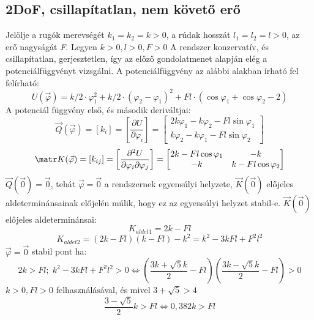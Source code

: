 \documentclass[12pt,twoside]{article}
\begin{document}
\subsection{2DoF, csillapítatlan, nem követő erő} %
Jelölje a rugók merevségét $  k_1=k_2=k>0 $, a rúdak hosszát $  l_1=l_2=l>0 $, az erő nagyságát \emph{F}. Legyen $ k>0, l>0, F>0 $  \newline
A rendszer konzervatív, és csillapítatlan, gerjesztetlen, így az előző gondolatmenet alapján elég a potenciálfüggvényt vizsgálni. \newline
A potenciálfüggvény az alábbi alakban írható fel felírható:
\begin{equation} \label{eq:Newton}
U(\vec\varphi)=k/2 \cdot \varphi_1 ^2 + k/2 \cdot (\varphi_2- \varphi_1) ^2 +F l \cdot ( \cos\varphi_1+ \cos\varphi_2 -2)
\end{equation}
A potenciál függvény első, és második deriváltjai:
\begin{equation} \label{eq:Newton}
\vec Q(\vec\varphi) =[k_{i}]=\left[ \frac{\partial U}{\partial \varphi_i }\right]=
\begin{bmatrix}
2k \varphi_1 - k \varphi_2-Fl\sin\varphi_1\\
k \varphi_2 - k \varphi_1-Fl\sin\varphi_2
\end{bmatrix}
\end{equation}
\begin{equation} \label{eq:Newton}
\matr K(\vec\varphi) =[k_{ij}]=\left[ \frac{\partial^2 U}{\partial \varphi_i \partial \varphi_j}\right]=
\begin{bmatrix}
2k-Fl \cos\varphi_1 & -k \\
-k & k-Fl \cos\varphi_2 
\end{bmatrix}
\end{equation}
$\vec{Q}(\vec0)=\vec0$, tehát $\vec\varphi = \vec0$ a rendszernek egyensúlyi helyzete, $\vec K(\vec0)$ előjeles aldeterminánsainak előjelén múlik, hogy ez az egyensúlyi helyzet stabil-e.\newline
$\vec K(\vec0)$ előjeles aldeterminánsai:
\begin{equation} \label{eq:Newton}
K_{aldet 1}=2k-Fl
\end{equation}
\begin{equation} \label{eq:Newton}
K_{aldet 2}=(2k-Fl)(k-Fl)-k^2=k^2-3kFl+F^2l^2
\end{equation}
$  \vec\varphi=\vec0  $ stabil pont ha:
\begin{equation} \label{eq:Newton}
2k>Fl; \; k^2-3kFl+F^2l^2>0  \Leftrightarrow \left(\frac{3k+\sqrt{5}k}{2}-Fl\right)\left(\frac{3k-\sqrt{5}k}{2}-Fl\right)>0
\end{equation}
  $ k>0 , Fl>0$ felhasználásával, és mivel $3+\sqrt5>4$
\begin{equation} \label{eq:Newton}
\frac{3-\sqrt{5}}{2}k>Fl \Leftrightarrow 0,382k>Fl
\end{equation}
\end{document}
